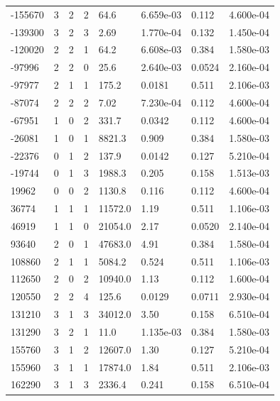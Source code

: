 \documentclass[preview]{standalone}
\begin{document}
{{\begin{tabular}{L{1.2cm}C{1.2cm} C{0.3cm}C{0.5cm} C{1.4cm}C{1.4cm} C{1.4cm}C{1.4cm}}
  -155670  &     3  & 2     &  2 &  64.6  & 6.659e-03  & 0.112 &  4.600e-04   \\ 
  -139300  &     3  & 2     &  3 &  2.69  & 1.770e-04  & 0.132 &  1.450e-04   \\ 
  -120020  &     2  & 2     &  1 &  64.2  & 6.608e-03  & 0.384 &  1.580e-03   \\ 
  -97996  &     2  & 2     &  0 &  25.6  & 2.640e-03  & 0.0524 &  2.160e-04   \\ 
  -97977  &     2  & 1     &  1 &  175.2  & 0.0181  & 0.511 &  2.106e-03   \\ 
  -87074  &     2  & 2     &  2 &  7.02  & 7.230e-04  & 0.112 &  4.600e-04   \\ 
  -67951  &     1  & 0     &  2 &  331.7  & 0.0342  & 0.112 &  4.600e-04   \\ 
  -26081  &     1  & 0     &  1 &  8821.3  & 0.909  & 0.384 &  1.580e-03   \\ 
  -22376  &     0  & 1     &  2 &  137.9  & 0.0142  & 0.127 &  5.210e-04   \\ 
  -19744  &     0  & 1     &  3 &  1988.3  & 0.205  & 0.158 &  1.513e-03   \\ 
  19962  &     0  & 0     &  2 &  1130.8  & 0.116  & 0.112 &  4.600e-04   \\ 
  36774  &     1  & 1     &  1 &  11572.0  & 1.19  & 0.511 &  1.106e-03   \\ 
  46919  &     1  & 1     &  0 &  21054.0  & 2.17  & 0.0520 &  2.140e-04   \\ 
  93640  &     2  & 0     &  1 &  47683.0  & 4.91  & 0.384 &  1.580e-04   \\ 
  108860  &     2  & 1     &  1 &  5084.2  & 0.524  & 0.511 &  1.106e-03   \\ 
  112650  &     2  & 0     &  2 &  10940.0  & 1.13  & 0.112 &  1.600e-04   \\ 
  120550  &     2  & 2     &  4 &  125.6  & 0.0129  & 0.0711 &  2.930e-04   \\ 
  131210  &     3  & 1     &  3 &  34012.0  & 3.50  & 0.158 &  6.510e-04   \\ 
  131290  &     3  & 2     &  1 &  11.0  & 1.135e-03  & 0.384 &  1.580e-03   \\ 
  155760  &     3  & 1     &  2 &  12607.0  & 1.30  & 0.127 &  5.210e-04   \\ 
  155960  &     3  & 1     &  1 &  17874.0  & 1.84  & 0.511 &  2.106e-03   \\ 
  162290  &     3  & 1     &  3 &  2336.4  & 0.241  & 0.158 &  6.510e-04   \\ 

\end{tabular}}}
\end{document}
